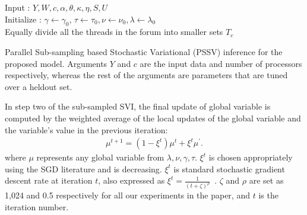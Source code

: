 \documentclass{sig-alternate}
\begin{document}
\begin{algorithm}[t]
\small
\SetAlgoLined
Input : $Y,W,c,\alpha,\theta,\kappa,\eta, S, U$\\
Initialize : $\gamma\leftarrow \gamma_0$,
$\tau\leftarrow \tau_0, \nu\leftarrow \nu_0, \lambda\leftarrow \lambda_0$\\
Equally divide all the threads in the forum into smaller sets $T_c$\\ 
\label{algo:stochasticAlgo}
\caption{{\small Parallel Sub-sampling based Stochastic Variational (PSSV) inference for
the proposed model. Arguments $Y$ and $c$ are the input data and number of processors
respectively, whereas the rest of the 
arguments are parameters that are tuned over a heldout set.}}
\end{algorithm}

In step two of the sub-sampled SVI, the final update of global variable is
computed by the weighted average of the local updates of the global variable and
the variable's value in the previous iteration:
\begin{align}
\mu^{t+1} = (1-\xi^t)\mu^{t} + \xi^t\mu^{'}. 
\label{eqn:globalUpStoc}
\end{align} 
\normalsize
where $\mu$ represents any global variable from $\lambda, \nu, \gamma, \tau$.
 $\xi^t$ is chosen appropriately using the SGD literature and is
decreasing.  $\xi^t$ is standard stochastic
gradient descent rate at iteration $t$, also expressed as $\xi^t =
\frac{1}{(t+\zeta)^{\rho}}$~\cite{conf/nips/GopalanMGFB12}. $\zeta$ and
$\rho$ are set as 1,024 and 0.5 respectively for all our experiments in the
paper, and $t$ is the iteration number. 
\end{document}
